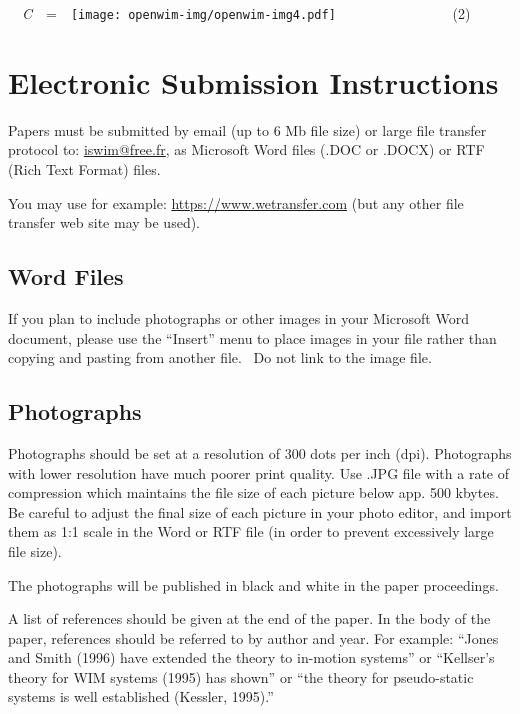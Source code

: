\documentclass[a4paper]{article}
\begin{document}
\bigskip

{
\ \ \textit{C}\ \ =\ \ 
\texttt{[image: openwim-img/openwim-img4.pdf]}
\ \ \ \ \ \ \ \ \ \ \ \ \ \ \ \ (2)}

\section{Electronic Submission Instructions}
{
Papers must be submitted by email (up to 6 Mb file size) or large file
transfer protocol to: \href{mailto:iswim@free.fr}{iswim@free.fr}, as
Microsoft Word files (.DOC or .DOCX) or RTF (Rich Text Format) files. }

{
You may use for example: \url{https://www.wetransfer.com} (but any other
file transfer web site may be used).}

\subsection{Word Files}
{
If you plan to include photographs or other images in your Microsoft
Word document, please use the “Insert” menu to place images in your
file rather than copying and pasting from another file. \ Do not link
to the image file.}

\subsection{Photographs}
{
Photographs should be set at a resolution of 300 dots per inch (dpi).
Photographs with lower resolution have much poorer print quality. Use
.JPG file with a rate of compression which maintains the file size of
each picture below app. 500 kbytes. Be careful to adjust the final size
of each picture in your photo editor, and import them as 1:1 scale in
the Word or RTF file (in order to prevent excessively large file
size).}


\bigskip

{
The photographs will be published in black and white in the paper
proceedings.}


\bigskip

{
A list of references should be given at the end of the paper. In the
body of the paper, references should be referred to by author and year.
For example: “Jones and Smith (1996) have extended the theory to
in-motion systems” or “Kellser’s theory for WIM systems (1995) has
shown” or “the theory for pseudo-static systems is well established
(Kessler, 1995).” }
\end{document}
